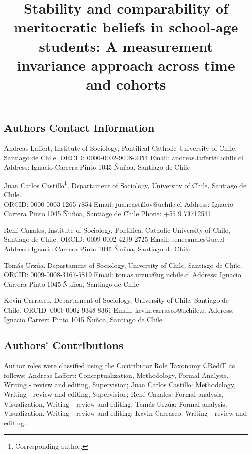 \documentclass[
  12pt,
  letterpaper,
  DIV=11,
  numbers=noendperiod]{scrartcl}
\title{Stability and comparability of meritocratic beliefs in school-age
students: A measurement invariance approach across time and cohorts}
\author{}
\date{}
\begin{document}
\maketitle


\subsection{Authors Contact
Information}\label{authors-contact-information}

Andreas Laffert, Institute of Sociology, Pontifical Catholic University
of Chile, Santiago de Chile. ORCID: 0000-0002-9008-2454 Email:
andreas.laffert@uchile.cl Address: Ignacio Carrera Pinto 1045 Ñuñoa,
Santiago de Chile

Juan Carlos Castillo\footnote{Corresponding author.}, Departament of
Sociology, University of Chile, Santiago de Chile.\\
ORCID: 0000-0003-1265-7854 Email: juancastillov@uchile.cl Address:
Ignacio Carrera Pinto 1045 Ñuñoa, Santiago de Chile Phone: +56 9
79712541

René Canales, Institute of Sociology, Pontifical Catholic University of
Chile, Santiago de Chile. ORCID: 0009-0002-4299-2725 Email:
renecanales@uc.cl Address: Ignacio Carrera Pinto 1045 Ñuñoa, Santiago de
Chile

Tomás Urzúa, Departament of Sociology, University of Chile, Santiago de
Chile. ORCID: 0009-0008-3167-6819 Email: tomas.urzua@ug.uchile.cl
Address: Ignacio Carrera Pinto 1045 Ñuñoa, Santiago de Chile

Kevin Carrasco, Departament of Sociology, University of Chile, Santiago
de Chile. ORCID: 0000-0002-9348-8361 Email: kevin.carrasco@uchile.cl
Address: Ignacio Carrera Pinto 1045 Ñuñoa, Santiago de Chile

\subsection{Authors' Contributions}\label{authors-contributions}

Author roles were classified using the Contributor Role Taxonomy
\href{https://credit.niso.org/}{CRediT} as follows: Andreas Laffert:
Conceptualization, Methodology, Formal Analysis, Writing - review and
editing, Supervision; Juan Carlos Castillo: Methodology, Writing -
review and editing, Supervision; René Canales: Formal analysis,
Visualization, Writing - review and editing; Tomás Urzúa: Formal
analysis, Visualization, Writing - review and editing; Kevin Carrasco:
Writing - review and editing.
\end{document}
